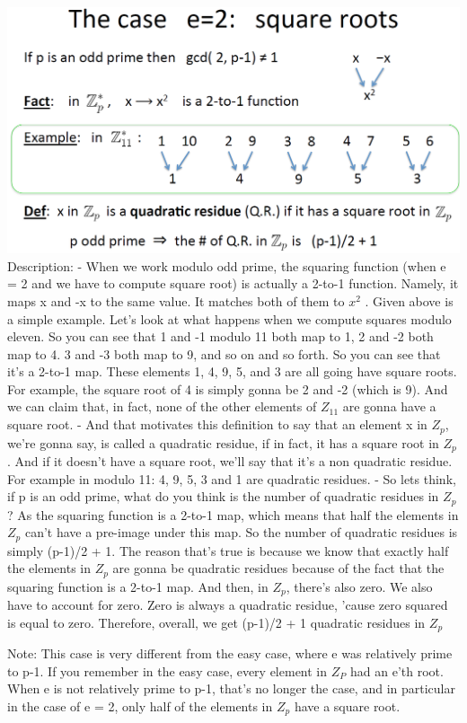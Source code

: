 \documentclass[11pt]{article}
\makeatletter
\def\maxwidth{\ifdim\Gin@nat@width>\linewidth\linewidth
    \else\Gin@nat@width\fi}
\let\Oldincludegraphics\includegraphics
\renewcommand{\includegraphics}[1]{\Oldincludegraphics[width=.8\maxwidth]{#1}}
\makeatother
\begin{document}
\includegraphics{./Images/NT-RootNonEasyCase.png} Description: - When we
work modulo odd prime, the squaring function (when e = 2 and we have to
compute square root) is actually a 2-to-1 function. Namely, it maps x
and -x to the same value. It matches both of them to \(x^{2}\) . Given
above is a simple example. Let's look at what happens when we compute
squares modulo eleven. So you can see that 1 and -1 modulo 11 both map
to 1, 2 and -2 both map to 4. 3 and -3 both map to 9, and so on and so
forth. So you can see that it's a 2-to-1 map. These elements 1, 4, 9, 5,
and 3 are all going have square roots. For example, the square root of 4
is simply gonna be 2 and -2 (which is 9). And we can claim that, in
fact, none of the other elements of \(Z_{11}\) are gonna have a square
root. - And that motivates this definition to say that an element x in
\(Z_{p}\), we're gonna say, is called a quadratic residue, if in fact,
it has a square root in \(Z_{p}\). And if it doesn't have a square root,
we'll say that it's a non quadratic residue. For example in modulo 11:
4, 9, 5, 3 and 1 are quadratic residues. - So lets think, if p is an odd
prime, what do you think is the number of quadratic residues in
\(Z_{p}\)? As the squaring function is a 2-to-1 map, which means that
half the elements in \(Z_{p}\) can't have a pre-image under this map. So
the number of quadratic residues is simply (p-1)/2 + 1. The reason
that's true is because we know that exactly half the elements in
\(Z_{p}\) are gonna be quadratic residues because of the fact that the
squaring function is a 2-to-1 map. And then, in \(Z_{p}\), there's also
zero. We also have to account for zero. Zero is always a quadratic
residue, 'cause zero squared is equal to zero. Therefore, overall, we
get (p-1)/2 + 1 quadratic residues in \(Z_{p}\)

Note: This case is very different from the easy case, where e was
relatively prime to p-1. If you remember in the easy case, every element
in \(Z_{P}\) had an e'th root. When e is not relatively prime to p-1,
that's no longer the case, and in particular in the case of e = 2, only
half of the elements in \(Z_{p}\) have a square root.
\end{document}
